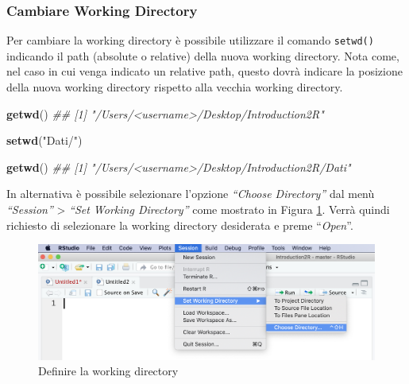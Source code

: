\documentclass[
]{book}
\newenvironment{Shaded}{\begin{snugshade}}{\end{snugshade}}
\newcommand{\CommentTok}[1]{\textcolor[rgb]{0.56,0.35,0.01}{\textit{#1}}}
\newcommand{\KeywordTok}[1]{\textcolor[rgb]{0.13,0.29,0.53}{\textbf{#1}}}
\newcommand{\NormalTok}[1]{#1}
\newcommand{\StringTok}[1]{\textcolor[rgb]{0.31,0.60,0.02}{#1}}
\begin{document}
\hypertarget{cambiare-working-directory}{%
\subsubsection*{Cambiare Working Directory}\label{cambiare-working-directory}}

Per cambiare la working directory è possibile utilizzare il comando \texttt{setwd()} indicando il path (absolute o relative) della nuova working directory. Nota come, nel caso in cui venga indicato un relative path, questo dovrà indicare la posizione della nuova working directory rispetto alla vecchia working directory.

\begin{Shaded}
\begin{Highlighting}[]
\KeywordTok{getwd}\NormalTok{()}
\CommentTok{## [1] "/Users/<username>/Desktop/Introduction2R"}

\KeywordTok{setwd}\NormalTok{(}\StringTok{"Dati/"}\NormalTok{)}

\KeywordTok{getwd}\NormalTok{()}
\CommentTok{## [1] "/Users/<username>/Desktop/Introduction2R/Dati"}
\end{Highlighting}
\end{Shaded}

In alternativa è possibile selezionare l'opzione \emph{``Choose Directory''} dal menù \emph{``Session''} \textgreater{} \emph{``Set Working Directory''} come mostrato in Figura \ref{fig:set-wd}. Verrà quindi richiesto di selezionare la working directory desiderata e preme ``\emph{Open}''.

\begin{figure}

{\centering \includegraphics[width=0.95\linewidth]{images/set-wd} 

}

\caption{Definire la working directory}\label{fig:set-wd}
\end{figure}
\end{document}
